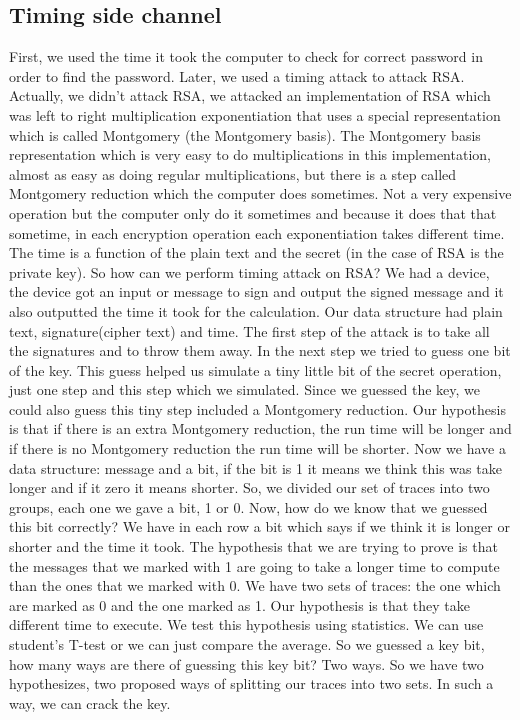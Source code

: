 \subsection{Timing side channel}\label{c8_prev_lectures_recap_timing_sc:subsec}
First, we used the time it took the computer to check for correct password in order to find the password. Later, we used a timing attack to attack RSA. Actually, we didn't attack RSA, we attacked an implementation of RSA which was left to right multiplication exponentiation that uses a special representation which is called Montgomery (the Montgomery basis). The Montgomery basis representation which is very easy to do multiplications in this implementation, almost as easy as doing regular multiplications, but there is a step called Montgomery reduction which the computer does sometimes. Not a very expensive operation but the computer only do it sometimes and because it does that that sometime, in each encryption operation each exponentiation takes different time. The time is a function of the plain text and the secret (in the case of RSA is the private key). So how can we perform timing attack on RSA? We had a device, the device got an input or message to sign and output the signed message and it also outputted the time it took for the calculation. Our data structure had plain text, signature(cipher text) and time.  The first step of the attack is to take all the signatures and to throw them away. In the next step we tried to guess one bit of the key. This guess helped us simulate a tiny little bit of the secret operation, just one step and this step which we simulated. Since we guessed the key, we could also guess this tiny step included a Montgomery reduction. Our hypothesis is that if there is an extra Montgomery reduction, the run time will be longer and if there is no Montgomery reduction the run time will be shorter. Now we have a data structure: message and a bit, if the bit is 1 it means we think this was take longer and if it zero it means shorter. So, we divided our set of traces into two groups, each one we gave a bit, 1 or 0. 
Now, how do we know that we guessed this bit correctly? We have in each row a bit which says if we think it is longer or shorter and the time it took. The hypothesis that we are trying to prove is that the messages that we marked with 1 are going to take a longer time to compute than the ones that we marked with 0. We have two sets of traces: the one which are marked as 0 and the one marked as 1. Our hypothesis is that they take different time to execute. We test this hypothesis using statistics. We can use student’s T-test or we can just compare the average. So we guessed a key bit, how many ways are there of guessing this key bit? Two ways. So we have two hypothesizes, two proposed ways of splitting our traces into two sets. In such a way, we can crack the key.

